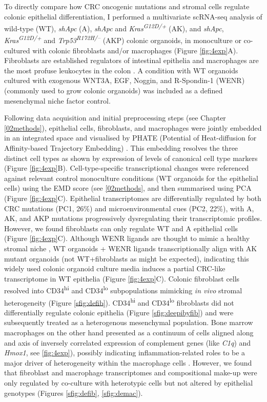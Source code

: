 To directly compare how CRC oncogenic mutations and stromal cells regulate colonic epithelial differentiation, I performed a multivariate scRNA-seq analysis of wild-type (WT), \textit{shApc} (A), \textit{shApc} and \textit{Kras\textsuperscript{G12D/+}} (AK), and \textit{shApc}, \textit{Kras\textsuperscript{G12D/+}} and \textit{Trp53\textsuperscript{R172H/–}} (AKP) colonic organoids, in monoculture or co-cultured with colonic fibroblasts and/or macrophages (Figure \ref{fig:4exp}A). Fibroblasts are established regulators of intestinal epithelia \cite{roulis_fibroblasts_2016} and macrophages are the most profuse leukocytes in the colon \cite{isidro_colonic_2016}. A condition with WT organoids cultured with exogenous WNT3A, EGF, Noggin, and R-Spondin-1 (WENR) (commonly used to grow colonic organoids) was included as a defined mesenchymal niche factor control. 

Following data acquisition and initial preprocessing steps (see Chapter \ref{02methods}), epithelial cells, fibroblasts, and macrophages were jointly embedded in an integrated space and visualised by PHATE (Potential of Heat-diffusion for Affinity-based Trajectory Embedding) \cite{moon_visualizing_2019}. This embedding resolves the three distinct cell types as shown by expression of levels of canonical cell type markers (Figure \ref{fig:4exp}B). 
Cell-type-specific transcriptional changes were referenced against relevant control monoculture conditions (WT organoids for the epithelial cells) using the EMD score (see \ref{02methods}, and then summarised using PCA (Figure \ref{fig:4exp}C). Epithelial transcriptomes are differentially regulated by both CRC mutations (PC1, 26\%) and microenvironmental cues (PC2, 22\%), with A, AK, and AKP mutations progressively dysregulating their transcriptomic profiles. However, we found fibroblasts can only regulate WT and A epithelial cells (Figure \ref{fig:4exp}C). Although WENR ligands are thought to mimic a healthy stromal niche \cite{mahe_establishment_2013}, WT organoids + WENR ligands transcriptionally align with AK mutant organoids (not WT+fibroblasts as might be expected), indicating this widely used colonic organoid culture media induces a partial CRC-like transcriptome in WT epithelia (Figure \ref{fig:4exp}C).
Colonic fibroblast cells resolved into CD34\textsuperscript{hi} and CD34\textsuperscript{lo} subpopulations mimicking \textit{in vivo} stromal heterogeneity \cite{karpus_colonic_2019} (Figure \ref{sfig:defib}). CD34\textsuperscript{hi} and CD34\textsuperscript{lo} fibroblasts did not differentially regulate colonic epithelia (Figure \ref{sfig:deepibyfib}) and were subsequently treated as a heterogenous mesenchymal population. Bone marrow macrophages on the other hand presented as a continuum of cells aligned along and axis of inversely correlated expression of complement genes (like \emph{C1q}) and \emph{Hmox1}, see \ref{fig:4exp}), possibly indicating inflammation-related roles to be a major driver of heterogeneity within the macrophage cells \cite{naito_heme_2014}. However, we found that fibroblast and macrophage transcriptomes and compositional make-up were only regulated by co-culture with heterotypic cells but not altered by epithelial genotypes (Figures \ref{sfig:defib}, \ref{sfig:demac}). 


